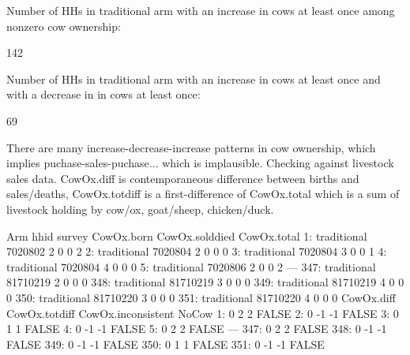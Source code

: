 Number of HHs in \textsf{traditional} arm with an increase in cows at least once among nonzero cow ownership:
\begin{Schunk}
\begin{Soutput}
[1] 142
\end{Soutput}
\end{Schunk}
Number of HHs in \textsf{traditional} arm with an increase in cows at least once and with a decrease in in cows at least once:
\begin{Schunk}
\begin{Soutput}
[1] 69
\end{Soutput}
\end{Schunk}
There are many increase-decrease-increase patterns in cow ownership, which implies puchase-sales-puchase... which is implausible. Checking against livestock sales data. \textsf{CowOx.diff} is contemporaneous difference between births and sales/deaths, \textsf{CowOx.totdiff} is a first-difference of \textsf{CowOx.total} which is a sum of livestock holding by cow/ox, goat/sheep, chicken/duck. %
\begin{Schunk}
\begin{Soutput}
             Arm     hhid survey CowOx.born CowOx.solddied CowOx.total
  1: traditional  7020802      2          0              0           2
  2: traditional  7020804      2          0              0           0
  3: traditional  7020804      3          0              0           1
  4: traditional  7020804      4          0              0           0
  5: traditional  7020806      2          0              0           2
 ---                                                                  
347: traditional 81710219      2          0              0           0
348: traditional 81710219      3          0              0           0
349: traditional 81710219      4          0              0           0
350: traditional 81710220      3          0              0           0
351: traditional 81710220      4          0              0           0
     CowOx.diff CowOx.totdiff CowOx.inconsistent NoCow
  1:          0             2                  2 FALSE
  2:          0            -1                 -1 FALSE
  3:          0             1                  1 FALSE
  4:          0            -1                 -1 FALSE
  5:          0             2                  2 FALSE
 ---                                                  
347:          0             2                  2 FALSE
348:          0            -1                 -1 FALSE
349:          0            -1                 -1 FALSE
350:          0             1                  1 FALSE
351:          0            -1                 -1 FALSE
\end{Soutput}
\end{Schunk}
